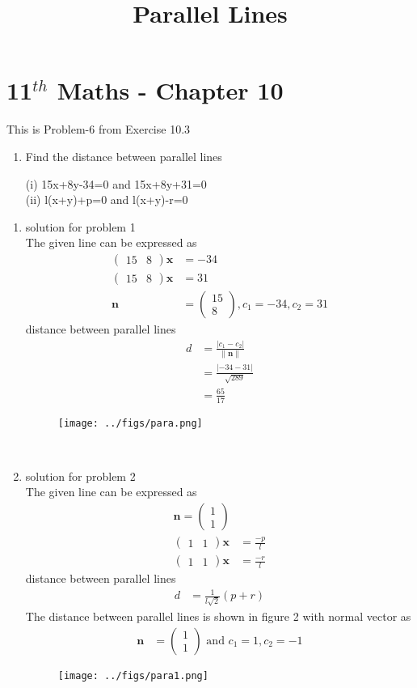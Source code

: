 \documentclass[12pt]{article}
\providecommand{\abs}[1]{\left\vert#1\right\vert}
\providecommand{\norm}[1]{\left\lVert#1\right\rVert}
\newcommand{\myvec}[1]{\ensuremath{\begin{pmatrix}#1\end{pmatrix}}}
\let\vec\mathbf
\begin{document}
\begin{center}
\title{\textbf{Parallel Lines}}
\date{\vspace{-5ex}} %
\maketitle
\end{center}
\setcounter{page}{1}
\section*{11$^{th}$ Maths - Chapter 10}
This is Problem-6 from Exercise 10.3
\begin{enumerate}
\item Find the distance between parallel lines

(i) 15x+8y-34=0 and  15x+8y+31=0 \\
(ii) l(x+y)+p=0 and  l(x+y)-r=0
\end{enumerate}
\begin{enumerate}

\item solution for problem 1
\\
The given line can be expressed as
\begin{align}
\myvec{15&8}\vec{x}&=-34\\
\myvec{15&8}\vec{x}&=31\\
\vec{n}&=\myvec{15\\8},c_1=-34,c_2= 31
\end{align}
distance between parallel lines
\begin{align}
d&=\frac{\abs{c_1-c_2}}{\norm{\vec{n}}}\\
&=\frac{\abs{-34-31}}{\sqrt{289}}\\
&=\frac{65}{17}
\end{align}
\begin{figure}[h!]
\centering
\texttt{[image: ../figs/para.png]}
\caption{}
\label{fig:para.png}
\end{figure}
\
 \item solution for problem 2
 \\
 The given line can be expressed as
\begin{align}
\vec{n}=\myvec{1\\1}\\
\myvec{1&1}\vec{x}&=\frac{-p}{l}\\
\myvec{1&1}\vec{x}&=\frac{-r}{l}
\end{align}
distance between parallel lines
\begin{align}
d&=\frac{1}{l\sqrt{2}}(p+r)
\end{align}
The distance between parallel lines
is shown in figure 2  with normal vector as
\begin{align*}
\vec{n}&=\myvec{1\\1} \text{ and }c_1=1,c_2=-1
\end{align*}
\begin{figure}[h!]
\centering
\texttt{[image: ../figs/para1.png]}
\caption{}
\label{fig:para1.png}
\end{figure}
\end{enumerate}
\end{document}

